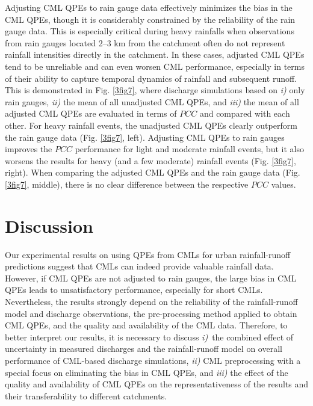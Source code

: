 \documentclass{ctuthesis}\usepackage[]{graphicx}\usepackage[]{color}
\begin{document}
Adjusting CML QPEs to rain gauge data effectively minimizes the bias in the CML QPEs, though it is considerably constrained by the reliability of the rain gauge data. This is especially critical during heavy rainfalls when observations from rain gauges located 2--3 km from the catchment often do not represent rainfall intensities directly in the catchment. In these cases, adjusted CML QPEs tend to be unreliable and can even worsen CML performance, especially in terms of their ability to capture temporal dynamics of rainfall and subsequent runoff. This is demonstrated in Fig. \ref{3fig7}, where discharge simulations based on \emph{i)} only rain gauges, \emph{ii)} the mean of all unadjusted CML QPEs, and \emph{iii)} the mean of all adjusted CML QPEs are evaluated in terms of $PCC$ and compared with each other. For heavy rainfall events, the unadjusted CML QPEs clearly outperform the rain gauge data (Fig. \ref{3fig7}, left). Adjusting CML QPEs to rain gauges improves the $PCC$ performance for light and moderate rainfall events, but it also worsens the results for heavy (and a few moderate) rainfall events (Fig. \ref{3fig7}, right). When comparing the adjusted CML QPEs and the rain gauge data (Fig. \ref{3fig7}, middle), there is no clear difference between the respective $PCC$ values.


\section{Discussion}

Our experimental results on using QPEs from CMLs for urban rainfall-runoff predictions suggest that CMLs can indeed provide valuable rainfall data. However, if CML QPEs are not adjusted to rain gauges, the large bias in CML QPEs leads to unsatisfactory performance, especially for short CMLs. Nevertheless, the results strongly depend on the reliability of the rainfall-runoff model and discharge observations, the pre-processing method applied to obtain CML QPEs, and the quality and availability of the CML data. Therefore, to better interpret our results, it is necessary to discuss \emph{i)}~the combined effect of uncertainty in measured discharges and the rainfall-runoff model on overall performance of CML-based discharge simulations, \emph{ii)} CML preprocessing with a special focus on eliminating the bias in CML QPEs, and \emph{iii)} the effect of the quality and availability of CML QPEs on the representativeness of the results and their transferability to different catchments.
\end{document}
